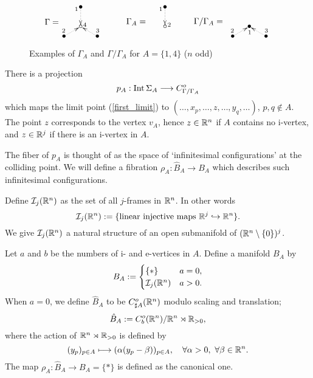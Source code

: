 \begin{figure}[htb]%
\[
 \begin{xy}
 (0,0)*{\circ}="O",(0,8)*{\bullet}="A",(-6.928,-4)*{\bullet}="B",(6.928,-4)*{\bullet}="C",
 {\ar@{.>}"A";"O"_<{1}^>{4}},{\ar@{.>}"B";"O"^<{2}},{\ar@{.>}"C";"O"_<{3}},(-12,2)*{\Gamma =},
 (35,0)*{\circ}="o",(35,8)*{\bullet}="a", {\ar@{.>}"a";"o"_<{1}^>{2}},(23,2)*{\Gamma_A =},
 (70,0)*{\bullet}="p",(63.072,-4)*{\bullet}="q",(76.928,-4)*{\bullet}="r",
 {\ar@{.>}"q";"p"^<{2}_>{1}}, {\ar@{.>}"r";"p"_<{3}},(53,2)*{\Gamma /\Gamma_A =},
 \end{xy}
\]
\caption{Examples of $\Gamma_A$ and $\Gamma /\Gamma_A$ for $A=\{ 1,4 \}$ ($n$ odd)}\label{fig_subgraph_noninfty}
\end{figure}


There is a projection
\[
 p_A : \mathrm{Int}\, \Sigma_A \longrightarrow C^o_{\Gamma / \Gamma_A}
\]
which maps the limit point (\ref{first_limit}) to $(\dots ,x_p , \dots ,z,\dots ,y_q ,\dots )$, $p,q \not\in A$.
The point $z$ corresponds to the vertex $v_A$, hence $z \in \mathbb{R}^n$ if $A$ contains no i-vertex, and $z \in \mathbb{R}^j$ if
there is an i-vertex in $A$.


The fiber of $p_A$ is thought of as the space of `infinitesimal configurations' at the colliding point.
We will define a fibration $\rho_A :\hat{B}_A \to B_A$ which describes such infinitesimal configurations.


\begin{defn}\label{def_I_j}
Define $\mathcal{I}_j (\mathbb{R}^n )$ as the set of all $j$-frames in $\mathbb{R}^n$.
In other words
\[
 \mathcal{I}_j (\mathbb{R}^n ) := \{ \text{linear injective maps } \mathbb{R}^j \hookrightarrow \mathbb{R}^n \} .
\]
We give $\mathcal{I}_j (\mathbb{R}^n )$ a natural structure of an open submanifold of $(\mathbb{R}^n \setminus \{ 0\})^j$.
\end{defn}


Let $a$ and $b$ be the numbers of i- and e-vertices in $A$.
Define a manifold $B_A$ by
\[
 B_A :=
 \begin{cases}
  \{ * \}     & a=0, \\
  \mathcal{I}_j (\mathbb{R}^n ) & a>0.
 \end{cases}
\]
When $a=0$, we define $\hat{B}_A$ to be $C^o_{\sharp A}(\mathbb{R}^n )$ modulo scaling and translation;
\[
 \hat{B}_A := C^o_b (\mathbb{R}^n ) / \mathbb{R}^n \rtimes \mathbb{R}_{>0} ,
\]
where the action of $\mathbb{R}^n \rtimes \mathbb{R}_{>0}$ is defined by
\[
 (y_p )_{p \in A} \longmapsto (\alpha (y_p -\beta ))_{p \in A},\quad \forall \alpha >0,\ \forall \beta \in \mathbb{R}^n .
\]
The map $\rho_A : \hat{B}_A \to B_A =\{ *\}$ is defined as the canonical one.


